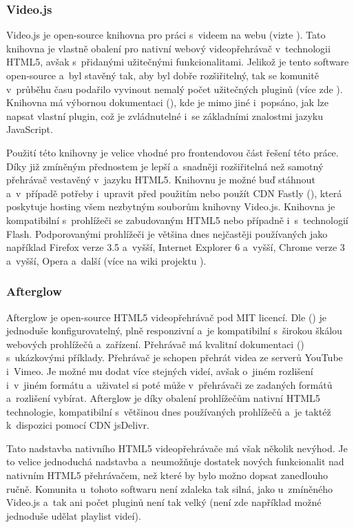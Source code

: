 \documentclass[thesis=M,czech]{FITthesis}[2012/06/26]
\begin{document}
\subsubsection{Video.js} \label{subsubsec:analyza_reseni_videojs}
Video.js je open-source knihovna pro práci s~videem na webu (vizte \cite{videojs_web}). Tato knihovna je vlastně obalení pro nativní webový videopřehrávač v~technologii HTML5, avšak s~přidanými užitečnými funkcionalitami. Jelikož je tento software open-source a~byl stavěný tak, aby byl dobře rozšiřitelný, tak se komunitě v~průběhu času podařilo vyvinout nemalý počet užitečných pluginů (více zde \cite{videojs_plg}). Knihovna má výbornou dokumentaci (\cite{videojs_doc}), kde je mimo jiné i~popsáno, jak lze napsat vlastní plugin, což je zvládnutelné i~se základními znalostmi jazyku JavaScript. 
	
	Použití této knihovny je velice vhodné pro frontendovou část řešení této práce. Díky již zmíněným přednostem je lepší a~snadněji rozšiřitelná než samotný přehrávač vestavěný v~jazyku HTML5. Knihovnu je možné buď stáhnout a~v~případě potřeby i~upravit před použitím nebo použít CDN Fastly (\cite{fastly_cdn}), která poskytuje hosting všem nezbytným souborům knihovny Video.js. Knihovna je kompatibilní s~prohlížeči se zabudovaným HTML5 nebo případně i~s~technologií Flash. Podporovanými prohlížeči je většina dnes nejčastěji používaných jako například Firefox verze 3.5 a~vyšší, Internet Explorer 6 a~vyšší, Chrome verze 3 a~vyšší, Opera a~další (více na wiki projektu \cite{videojs_wiki}).

\subsubsection{Afterglow} \label{subsubsec:analyza_reseni_afterglow}
Afterglow je open-source HTML5 videopřehrávač pod MIT licencí. Dle (\cite{afterglow}) je jednoduše konfigurovatelný, plně responzivní a~je kompatibilní s~širokou škálou webových prohlížečů a~zařízení. Přehrávač má kvalitní dokumentaci (\cite{afterglow_doc}) s~ukázkovými příklady. Přehrávač je schopen přehrát videa ze serverů YouTube i~Vimeo. Je možné mu dodat více stejných videí, avšak o~jiném rozlišení i~v~jiném formátu a~uživatel si poté může v~přehrávači ze zadaných formátů a~rozlišení vybírat. Afterglow je díky obalení prohlížečům nativní HTML5 technologie, kompatibilní s~většinou dnes používaných prohlížečů a~je taktéž k~dispozici pomocí CDN jsDelivr.
	
	Tato nadstavba nativního HTML5 videopřehrávače má však několik nevýhod. Je to velice jednoduchá nadstavba a~neumožňuje dostatek nových funkcionalit nad nativním HTML5 přehrávačem, než které by bylo možno dopsat zanedlouho ručně. Komunita u~tohoto softwaru není zdaleka tak silná, jako u~zmíněného Video.js a~tak ani počet pluginů není tak velký (není zde například možné jednoduše udělat playlist videí).
\end{document}
